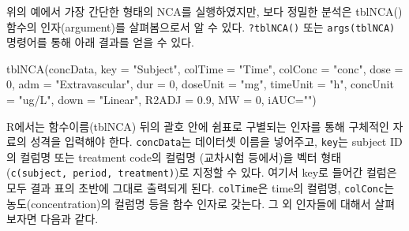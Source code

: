 \documentclass[
  11pt,
  krantz2, a4paper, twoside]{krantz}
\newenvironment{Shaded}{\begin{snugshade}}{\end{snugshade}}
\newcommand{\AttributeTok}[1]{\textcolor[rgb]{0.77,0.63,0.00}{#1}}
\newcommand{\DecValTok}[1]{\textcolor[rgb]{0.00,0.00,0.81}{#1}}
\newcommand{\FloatTok}[1]{\textcolor[rgb]{0.00,0.00,0.81}{#1}}
\newcommand{\FunctionTok}[1]{\textcolor[rgb]{0.00,0.00,0.00}{#1}}
\newcommand{\NormalTok}[1]{#1}
\newcommand{\StringTok}[1]{\textcolor[rgb]{0.31,0.60,0.02}{#1}}
\theoremstyle{definition}
\theoremstyle{definition}
\theoremstyle{definition}
\theoremstyle{definition}
\theoremstyle{remark}
\begin{document}
위의 예에서 가장 간단한 형태의 NCA를 실행하였지만, 보다 정밀한 분석은 tblNCA() 함수의 인자(argument)를 살펴봄으로서 알 수 있다. \texttt{?tblNCA()} 또는 \texttt{args(tblNCA)} 명령어를 통해 아래 결과를 얻을 수 있다.

\begin{Shaded}
\begin{Highlighting}[]
\FunctionTok{tblNCA}\NormalTok{(concData, }\AttributeTok{key =} \StringTok{"Subject"}\NormalTok{, }\AttributeTok{colTime =} \StringTok{"Time"}\NormalTok{, }\AttributeTok{colConc =} \StringTok{"conc"}\NormalTok{, }
       \AttributeTok{dose =} \DecValTok{0}\NormalTok{, }\AttributeTok{adm =} \StringTok{"Extravascular"}\NormalTok{, }\AttributeTok{dur =} \DecValTok{0}\NormalTok{, }\AttributeTok{doseUnit =} \StringTok{"mg"}\NormalTok{, }
       \AttributeTok{timeUnit =} \StringTok{"h"}\NormalTok{, }\AttributeTok{concUnit =} \StringTok{"ug/L"}\NormalTok{, }\AttributeTok{down =} \StringTok{"Linear"}\NormalTok{, }\AttributeTok{R2ADJ =} \FloatTok{0.9}\NormalTok{, }
       \AttributeTok{MW =} \DecValTok{0}\NormalTok{, }\AttributeTok{iAUC=}\StringTok{""}\NormalTok{)}
\end{Highlighting}
\end{Shaded}

R에서는 함수이름(tblNCA) 뒤의 괄호 안에 쉼표로 구별되는 인자를 통해 구체적인 자료의 성격을 입력해야 한다.
\texttt{concData}는 데이터셋 이름을 넣어주고, \texttt{key}는 subject ID의 컬럼명 또는 treatment code의 컬럼명 (교차시험 등에서)을 벡터 형태(\texttt{c(\textquotesingle{}subject\textquotesingle{},\ \textquotesingle{}period\textquotesingle{},\ \textquotesingle{}treatment\textquotesingle{})})로 지정할 수 있다. 여기서 key로 들어간 컬럼은 모두 결과 표의 초반에 그대로 출력되게 된다.
\texttt{colTime}은 time의 컬럼명, \texttt{colConc}는 농도(concentration)의 컬럼명 등을 함수 인자로 갖는다. 그 외 인자들에 대해서 살펴보자면 다음과 같다.
\end{document}
